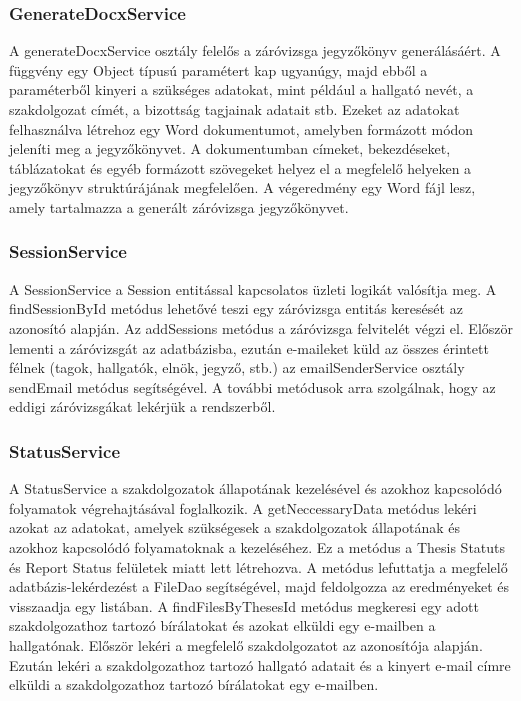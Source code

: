 \subsubsection{GenerateDocxService}

A generateDocxService osztály felelős a záróvizsga jegyzőkönyv generálásáért. A függvény egy Object típusú paramétert kap ugyanúgy, majd ebből a paraméterből kinyeri a szükséges adatokat, mint például a hallgató nevét, a szakdolgozat címét, a bizottság tagjainak adatait stb. Ezeket az adatokat felhasználva létrehoz egy Word dokumentumot, amelyben formázott módon jeleníti meg a jegyzőkönyvet. A dokumentumban címeket, bekezdéseket, táblázatokat és egyéb formázott szövegeket helyez el a megfelelő helyeken a jegyzőkönyv struktúrájának megfelelően. A végeredmény egy Word fájl lesz, amely tartalmazza a generált záróvizsga jegyzőkönyvet.

\subsubsection{SessionService}

A SessionService a Session entitással kapcsolatos üzleti logikát valósítja meg. A findSessionById metódus lehetővé teszi egy záróvizsga entitás keresését az azonosító alapján. Az addSessions metódus a záróvizsga felvitelét végzi el. Először lementi a záróvizsgát az adatbázisba, ezután e-maileket küld az összes érintett félnek (tagok, hallgatók, elnök, jegyző, stb.) az emailSenderService osztály sendEmail metódus segítségével. A további metódusok arra szolgálnak, hogy az eddigi záróvizsgákat lekérjük a rendszerből.

\subsubsection{StatusService}

A StatusService a szakdolgozatok állapotának kezelésével és azokhoz kapcsolódó folyamatok végrehajtásával foglalkozik. A getNeccessaryData metódus lekéri azokat az adatokat, amelyek szükségesek a szakdolgozatok állapotának és azokhoz kapcsolódó folyamatoknak a kezeléséhez. Ez a metódus a Thesis Statuts és Report Status felületek miatt lett létrehozva. A metódus lefuttatja a megfelelő adatbázis-lekérdezést a FileDao segítségével, majd feldolgozza az eredményeket és visszaadja egy listában. A findFilesByThesesId metódus megkeresi egy adott szakdolgozathoz tartozó bírálatokat és azokat elküldi egy e-mailben a hallgatónak. Először lekéri a megfelelő szakdolgozatot az azonosítója alapján. Ezután lekéri a szakdolgozathoz tartozó hallgató adatait és a kinyert e-mail címre elküldi a szakdolgozathoz tartozó bírálatokat egy e-mailben.


